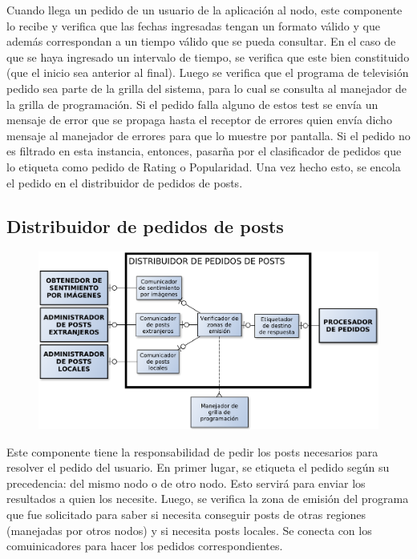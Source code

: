 Cuando llega un pedido de un usuario de la aplicación al nodo, este componente lo recibe y verifica que las fechas ingresadas tengan un formato válido y que 
además correspondan a un tiempo válido que se pueda consultar. En el caso de que se haya ingresado un intervalo de tiempo, se verifica que este bien constituido (que el inicio sea anterior al final). Luego se verifica que el programa de televisión pedido sea parte de la grilla del sistema, para lo cual se consulta al manejador de la grilla de programación. Si el pedido falla alguno de estos test se envía un mensaje de error que se propaga hasta el receptor de errores quien envía dicho mensaje al manejador de errores para que lo muestre por pantalla. Si el pedido no es filtrado en esta instancia, entonces, pasarña por el clasificador de pedidos que lo etiqueta como pedido de Rating o Popularidad. Una vez hecho esto, se encola el pedido en el distribuidor de pedidos de posts.

\subsection{Distribuidor de pedidos de posts}

\begin{figure}[H]
\centering
\includegraphics[width=\textwidth]{graph/distribuidor.pdf}
\end{figure}

Este componente tiene la responsabilidad de pedir los posts necesarios para resolver el pedido del usuario. En primer lugar, se etiqueta el pedido según su precedencia: del mismo nodo o de otro nodo. Esto servirá para enviar los resultados a quien los necesite. Luego, se verifica la zona de emisión del programa que fue solicitado para saber si necesita conseguir posts de otras regiones (manejadas por otros nodos) y si necesita posts locales. Se conecta con los comuinicadores para hacer los pedidos correspondientes.

